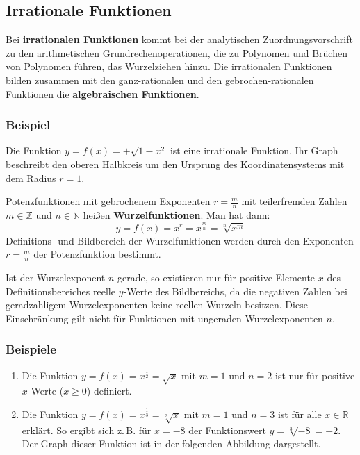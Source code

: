 \subsection{Irrationale Funktionen}

Bei \textbf{irrationalen Funktionen} kommt bei der analytischen Zuordnungsvorschrift zu den arithmetischen Grundrechenoperationen, die zu Polynomen und Brüchen von Polynomen führen, das Wurzelziehen hinzu. Die irrationalen Funktionen bilden zusammen mit den ganz-rationalen und den gebrochen-rationalen Funktionen die \textbf{algebraischen Funktionen}.

\subsubsection{Beispiel}

Die Funktion $y = f(x) = +\sqrt{1 - x^2}$ ist eine irrationale Funktion. Ihr Graph beschreibt den oberen Halbkreis um den Ursprung des Koordinatensystems mit dem Radius $r = 1$.\beispielende

Potenzfunktionen mit gebrochenem Exponenten $r = \tfrac{m}{n}$ mit teilerfremden Zahlen $m \in \mathbb{Z}$ und $n \in \mathbb{N}$ heißen \textbf{Wurzelfunktionen}. Man hat dann:
\[ y = f(x) = x^r = x^{\frac{m}{n}} = \sqrt[n]{x^m} \]
Definitions- und Bildbereich der Wurzelfunktionen werden durch den Exponenten $r = \tfrac{m}{n}$ der Potenzfunktion bestimmt.

Ist der Wurzelexponent $n$ gerade, so existieren nur für positive Elemente $x$ des Definitionsbereiches reelle $y$-Werte des Bildbereichs, da die negativen Zahlen bei geradzahligem Wurzelexponenten keine reellen Wurzeln besitzen. Diese Einschränkung gilt nicht für Funktionen mit ungeraden Wurzelexponenten $n$.

\subsubsection{Beispiele}

\begin{enumerate}[label=\alph*)]
  \item Die Funktion $y = f(x) = x^{\frac{1}{2}} = \sqrt{x}$ mit $m = 1$ und $n = 2$ ist nur für positive $x$-Werte ($x \geq 0$) definiert.
  \item Die Funktion $y = f(x) = x^{\frac{1}{3}} = \sqrt[3]{x}$ mit $m = 1$ und $n = 3$ ist für alle $x \in \mathbb{R}$ erklärt. So ergibt sich z.\,B. für $x = -8$ der Funktionswert $y = \sqrt[3]{-8} = -2$. Der Graph dieser Funktion ist in der folgenden Abbildung dargestellt.\beispielende
\end{enumerate}

